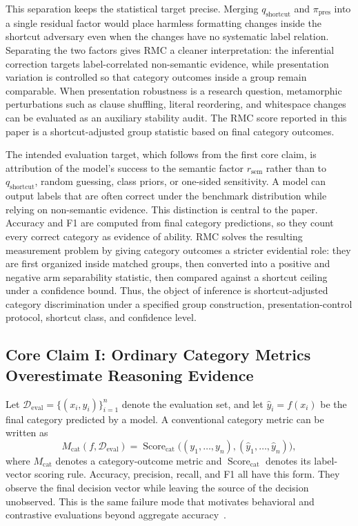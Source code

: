 \documentclass[conference]{IEEEtran}
\theoremstyle{remark}
\newcommand{\reasonFac}{r_{\mathrm{sem}}}
\newcommand{\shortcutFac}{q_{\mathrm{shortcut}}}
\newcommand{\presentationFac}{\pi_{\mathrm{pres}}}
\newcommand{\EvalSet}{\mathcal{D}_{\mathrm{eval}}}
\newcommand{\CatMetric}{M_{\mathrm{cat}}}
\newcommand{\CatScore}{\operatorname{Score}_{\mathrm{cat}}}
\begin{document}
This separation keeps the statistical target precise.  Merging $\shortcutFac$ and $\presentationFac$ into a single residual factor would place harmless formatting changes inside the shortcut adversary even when the changes have no systematic label relation.  Separating the two factors gives RMC a cleaner interpretation: the inferential correction targets label-correlated non-semantic evidence, while presentation variation is controlled so that category outcomes inside a group remain comparable.  When presentation robustness is a research question, metamorphic perturbations such as clause shuffling, literal reordering, and whitespace changes can be evaluated as an auxiliary stability audit.  The RMC score reported in this paper is a shortcut-adjusted group statistic based on final category outcomes.

The intended evaluation target, which follows from the first core claim, is attribution of the model's success to the semantic factor $\reasonFac$ rather than to $\shortcutFac$, random guessing, class priors, or one-sided sensitivity.  A model can output labels that are often correct under the benchmark distribution while relying on non-semantic evidence.  This distinction is central to the paper.  Accuracy and F1 are computed from final category predictions, so they count every correct category as evidence of ability.  RMC solves the resulting measurement problem by giving category outcomes a stricter evidential role: they are first organized inside matched groups, then converted into a positive and negative arm separability statistic, then compared against a shortcut ceiling under a confidence bound.  Thus, the object of inference is shortcut-adjusted category discrimination under a specified group construction, presentation-control protocol, shortcut class, and confidence level.

\subsection{Core Claim I: Ordinary Category Metrics Overestimate Reasoning Evidence}
\label{sec:ordinary-metrics}

Let $\EvalSet=\{(x_i,y_i)\}_{i=1}^n$ denote the evaluation set, and let
$\hat y_i=f(x_i)$ be the final category predicted by a model.  A conventional
category metric can be written as
\begin{equation}\label{eq:formula-02}
\CatMetric(f,\EvalSet)
=
\CatScore\bigl((y_1,\ldots,y_n),(\hat y_1,\ldots,\hat y_n)\bigr),
\end{equation}
where $\CatMetric$ denotes a category-outcome metric and $\CatScore$ denotes its label-vector scoring rule.  Accuracy, precision, recall, and F1 all have this form.  They observe the final decision vector while leaving the source of the decision unobserved.  This is the same failure mode that motivates behavioral and contrastive evaluations beyond aggregate accuracy~\cite{ribeiro2020checklist,gardner2020contrast}.
\end{document}
